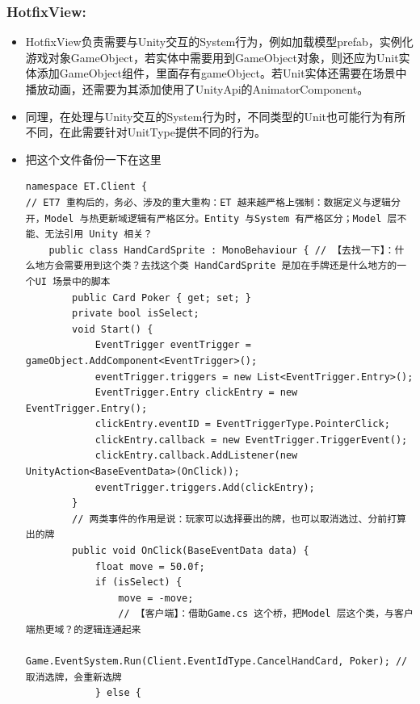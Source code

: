 \documentclass[9pt, b5paper]{article}
\begin{document}
\subsubsection{HotfixView:}
\label{sec-8-12-4}
\begin{itemize}
\item HotfixView负责需要与Unity交互的System行为，例如加载模型prefab，实例化游戏对象GameObject，若实体中需要用到GameObject对象，则还应为Unit实体添加GameObject组件，里面存有gameObject。若Unit实体还需要在场景中播放动画，还需要为其添加使用了UnityApi的AnimatorComponent。
\item 同理，在处理与Unity交互的System行为时，不同类型的Unit也可能行为有所不同，在此需要针对UnitType提供不同的行为。
\item 把这个文件备份一下在这里
\begin{verbatim}
namespace ET.Client {
// ET7 重构后的，务必、涉及的重大重构：ET 越来越严格上强制：数据定义与逻辑分开，Model 与热更新域逻辑有严格区分。Entity 与System 有严格区分；Model 层不能、无法引用 Unity 相关？
    public class HandCardSprite : MonoBehaviour { // 【去找一下】：什么地方会需要用到这个类？去找这个类 HandCardSprite 是加在手牌还是什么地方的一个UI 场景中的脚本
        public Card Poker { get; set; }
        private bool isSelect;
        void Start() {
            EventTrigger eventTrigger = gameObject.AddComponent<EventTrigger>();
            eventTrigger.triggers = new List<EventTrigger.Entry>();
            EventTrigger.Entry clickEntry = new EventTrigger.Entry();
            clickEntry.eventID = EventTriggerType.PointerClick;
            clickEntry.callback = new EventTrigger.TriggerEvent();
            clickEntry.callback.AddListener(new UnityAction<BaseEventData>(OnClick));
            eventTrigger.triggers.Add(clickEntry);
        }
        // 两类事件的作用是说：玩家可以选择要出的牌，也可以取消选过、分前打算出的牌
        public void OnClick(BaseEventData data) {
            float move = 50.0f;
            if (isSelect) {
                move = -move;
                // 【客户端】：借助Game.cs 这个桥，把Model 层这个类，与客户端热更域？的逻辑连通起来
                Game.EventSystem.Run(Client.EventIdType.CancelHandCard, Poker); // 取消选牌，会重新选牌
            } else {
 

\end{verbatim}
\end{itemize}
\end{document}
